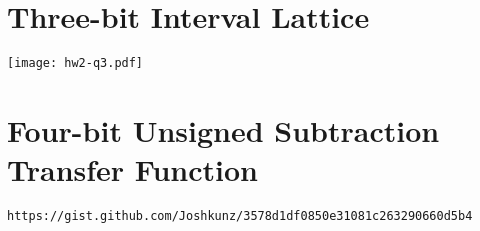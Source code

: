 \documentclass[12pt]{article}
\begin{document}
\section{Three-bit Interval Lattice}

\begin{center}
\texttt{[image: hw2-q3.pdf]}
\end{center}

\section{Four-bit Unsigned Subtraction Transfer Function}

\verb|https://gist.github.com/Joshkunz/3578d1df0850e31081c263290660d5b4|
\end{document}
